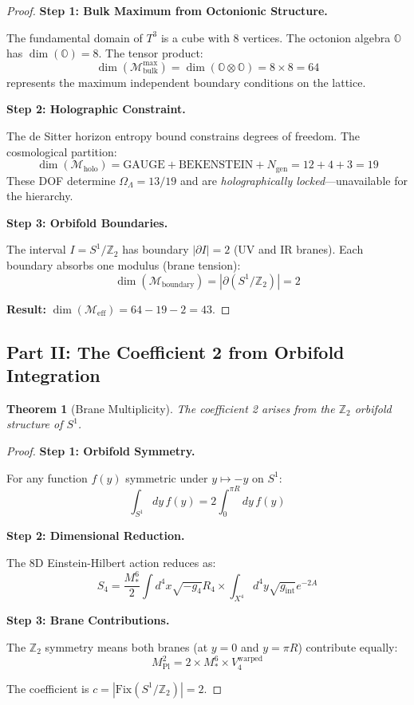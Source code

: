 \documentclass[11pt,a4paper]{article}
\theoremstyle{plain}
\newtheorem{theorem}{Theorem}[section]
\theoremstyle{definition}
\theoremstyle{remark}
\newcommand{\Mpl}{M_{\text{Pl}}}
\newcommand{\Ngen}{N_{\text{gen}}}
\newcommand{\OmegaL}{\Omega_\Lambda}
\newcommand{\Ztwo}{\mathbb{Z}_2}
\newcommand{\GAUGE}{\text{GAUGE}}
\newcommand{\BEK}{\text{BEKENSTEIN}}
\begin{document}
\begin{proof}
\textbf{Step 1: Bulk Maximum from Octonionic Structure.}

The fundamental domain of $T^3$ is a cube with 8 vertices. The octonion algebra $\mathbb{O}$ has $\dim(\mathbb{O}) = 8$. The tensor product:
\[
\dim(\mathcal{M}_{\text{bulk}}^{\max}) = \dim(\mathbb{O} \otimes \mathbb{O}) = 8 \times 8 = 64
\]
represents the maximum independent boundary conditions on the lattice.

\textbf{Step 2: Holographic Constraint.}

The de Sitter horizon entropy bound constrains degrees of freedom. The cosmological partition:
\[
\dim(\mathcal{M}_{\text{holo}}) = \GAUGE + \BEK + \Ngen = 12 + 4 + 3 = 19
\]
These DOF determine $\OmegaL = 13/19$ and are \emph{holographically locked}---unavailable for the hierarchy.

\textbf{Step 3: Orbifold Boundaries.}

The interval $I = S^1/\Ztwo$ has boundary $|\partial I| = 2$ (UV and IR branes). Each boundary absorbs one modulus (brane tension):
\[
\dim(\mathcal{M}_{\text{boundary}}) = |\partial(S^1/\Ztwo)| = 2
\]

\textbf{Result:} $\dim(\mathcal{M}_{\text{eff}}) = 64 - 19 - 2 = 43$.
\end{proof}

\subsection{Part II: The Coefficient 2 from Orbifold Integration}

\begin{theorem}[Brane Multiplicity]
The coefficient 2 arises from the $\Ztwo$ orbifold structure of $S^1$.
\end{theorem}

\begin{proof}
\textbf{Step 1: Orbifold Symmetry.}

For any function $f(y)$ symmetric under $y \mapsto -y$ on $S^1$:
\[
\int_{S^1} dy \, f(y) = 2 \int_0^{\pi R} dy \, f(y)
\]

\textbf{Step 2: Dimensional Reduction.}

The 8D Einstein-Hilbert action reduces as:
\[
S_4 = \frac{M_*^6}{2} \int d^4x \sqrt{-g_4} R_4 \times \int_{X^4} d^4y \sqrt{g_{\text{int}}} e^{-2A}
\]

\textbf{Step 3: Brane Contributions.}

The $\Ztwo$ symmetry means both branes (at $y=0$ and $y=\pi R$) contribute equally:
\[
\Mpl^2 = 2 \times M_*^6 \times V_4^{\text{warped}}
\]

The coefficient is $c = |\text{Fix}(S^1/\Ztwo)| = 2$.
\end{proof}
\end{document}
